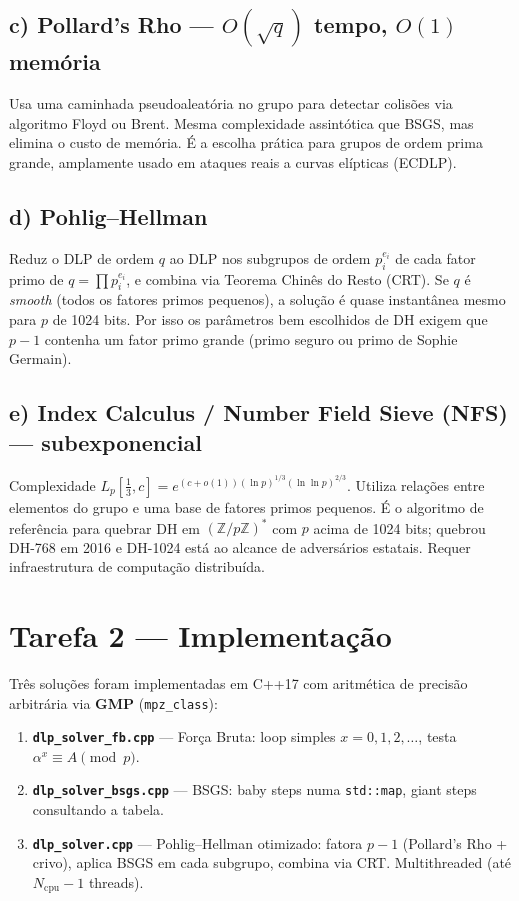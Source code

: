 \documentclass[conference, onecolumn]{IEEEtran}
\begin{document}
\subsection{c) Pollard's Rho --- $O(\sqrt{q})$ tempo, $O(1)$ memória}

Usa uma caminhada pseudoaleatória no grupo para detectar colisões via algoritmo
Floyd ou Brent. Mesma complexidade assintótica que BSGS, mas elimina o custo de memória.
É a escolha prática para grupos de ordem prima grande, amplamente usado em ataques reais
a curvas elípticas (ECDLP).

\subsection{d) Pohlig--Hellman}

Reduz o DLP de ordem $q$ ao DLP nos subgrupos de ordem $p_i^{e_i}$ de cada fator primo
de $q = \prod p_i^{e_i}$, e combina via Teorema Chinês do Resto (CRT).
Se $q$ é \emph{smooth} (todos os fatores primos pequenos), a solução é quase instantânea
mesmo para $p$ de 1024 bits. Por isso os parâmetros bem escolhidos de DH exigem que
$p-1$ contenha um fator primo grande (primo seguro ou primo de Sophie Germain).

\subsection{e) Index Calculus / Number Field Sieve (NFS) --- subexponencial}

Complexidade $L_p[\tfrac{1}{3}, c] = e^{(c+o(1))(\ln p)^{1/3}(\ln \ln p)^{2/3}}$.
Utiliza relações entre elementos do grupo e uma base de fatores primos pequenos.
É o algoritmo de referência para quebrar DH em $(\mathbb{Z}/p\mathbb{Z})^*$ com $p$
acima de 1024 bits; quebrou DH-768 em 2016 e DH-1024 está ao alcance de adversários
estatais. Requer infraestrutura de computação distribuída.

\section{Tarefa 2 — Implementação}

Três soluções foram implementadas em C++17 com aritmética de precisão arbitrária via
\textbf{GMP} (\texttt{mpz\_class}):

\begin{enumerate}
    \item \textbf{\texttt{dlp\_solver\_fb.cpp}} --- Força Bruta: loop simples
          $x = 0, 1, 2, \ldots$, testa $\alpha^x \equiv A \pmod{p}$.
    \item \textbf{\texttt{dlp\_solver\_bsgs.cpp}} --- BSGS: baby steps numa
          \texttt{std::map}, giant steps consultando a tabela.
    \item \textbf{\texttt{dlp\_solver.cpp}} --- Pohlig--Hellman otimizado:
          fatora $p-1$ (Pollard's Rho + crivo), aplica BSGS em cada subgrupo,
          combina via CRT. Multithreaded (até $N_{\mathrm{cpu}}-1$ threads).
\end{enumerate}
\end{document}
